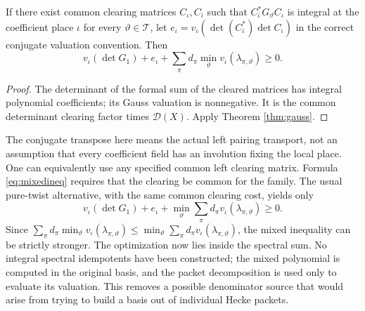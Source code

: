 \documentclass[11pt,a4paper]{article}
\begin{document}
\begin{corollary}\label{cor:mixed}
If there exist common clearing matrices $C_\iota,C_{\bar\iota}$ such that $C_{\bar\iota}^*G_\vartheta C_\iota$ is integral at the coefficient place $\iota$ for every $\vartheta\in\mathcal T$, let $e_\iota=v_\iota(\det(C_{\bar\iota}^*)\det C_\iota)$ in the correct conjugate valuation convention. Then
\begin{equation}\label{eq:mixedineq}
v_\iota(\det G_1)+e_\iota+\sum_\pi d_\pi\min_\vartheta v_\iota(\lambda_{\pi,\vartheta})\geq0.
\end{equation}
\end{corollary}
\begin{proof}The determinant of the formal sum of the cleared matrices has integral polynomial coefficients; its Gauss valuation is nonnegative. It is the common determinant clearing factor times $\mathscr D(X)$. Apply Theorem \ref{thm:gauss}.\end{proof}
The conjugate transpose here means the actual left pairing transport, not an assumption that every coefficient field has an involution fixing the local place. One can equivalently use any specified common left clearing matrix. Formula \eqref{eq:mixedineq} requires that the clearing be common for the family. The usual pure-twist alternative, with the same common clearing cost, yields only
\begin{equation}v_\iota(\det G_1)+e_\iota+\min_\vartheta\sum_\pi d_\pi v_\iota(\lambda_{\pi,\vartheta})\geq0.\end{equation}
Since $\sum_\pi d_\pi\min_\vartheta v_\iota(\lambda_{\pi,\vartheta})\leq\min_\vartheta\sum_\pi d_\pi v_\iota(\lambda_{\pi,\vartheta})$, the mixed inequality can be strictly stronger. The optimization now lies inside the spectral sum. No integral spectral idempotents have been constructed; the mixed polynomial is computed in the original basis, and the packet decomposition is used only to evaluate its valuation. This removes a possible denominator source that would arise from trying to build a basis out of individual Hecke packets.
\end{document}
